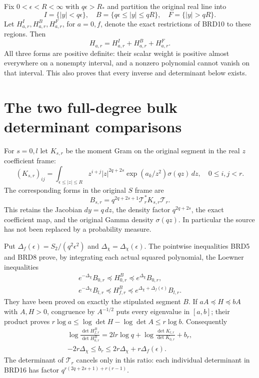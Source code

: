 \documentclass[11pt,a4paper]{article}
\begin{document}
Fix $0<\epsilon<R<\infty$ with $q\epsilon>R_*$ and partition
the original real line into
\[
 I=\{|y|<q\epsilon\},\quad
 B=\{q\epsilon\leq|y|\leq qR\},\quad
 F=\{|y|>qR\}.
\tag{BRD13}
\]
Let $H_{a,r}^I,H_{a,r}^B,H_{a,r}^F$, for $a=0,f$, denote
the exact restrictions of BRD10 to these regions. Then
\[
 H_{a,r}=H_{a,r}^I+H_{a,r}^B+H_{a,r}^F.\tag{BRD14}
\]
All three forms are positive definite: their scalar weight is
positive almost everywhere on a nonempty interval, and a nonzero
polynomial cannot vanish on that interval. This also proves that
every inverse and determinant below exists.

\section{The two full-degree bulk determinant comparisons}

For $s=0,l$ let $K_{s,r}$ be the moment Gram on the original
segment in the real $z$ coefficient frame:
\[
 (K_{s,r})_{ij}=\int_{\epsilon\leq|z|\leq R}
 z^{i+j}|z|^{2q+2s}\exp(a_k/z^2)\sigma(qz)\,dz,
 \quad 0\leq i,j<r.
\tag{BRD15}
\]
The corresponding forms in the original $S$ frame are
\[
 B_{s,r}=q^{2q+2s+1}\mathcal T_r^*K_{s,r}\mathcal T_r.
\tag{BRD16}
\]
This retains the Jacobian $dy=q\,dz$, the density factor
$q^{2q+2s}$, the exact coefficient map, and the original Gamma
density $\sigma(qz)$. In particular the source has not been
replaced by a probability measure.

Put $\Delta_f(\epsilon)=S_2/(q^2\epsilon^2)$ and
$\Delta_\chi=\Delta_\chi(\epsilon)$. The pointwise inequalities
BRD5 and BRD8 prove, by integrating each actual squared
polynomial, the Loewner inequalities
\[
\begin{gathered}
 e^{-\Delta_\chi}B_{0,r}\preceq H_{0,r}^B
                    \preceq e^{\Delta_\chi}B_{0,r},\\
 e^{-\Delta_\chi}B_{l,r}\preceq H_{f,r}^B
                    \preceq e^{\Delta_\chi+\Delta_f(\epsilon)}B_{l,r}.
\end{gathered}\tag{BRD17}
\]
They have been proved on exactly the stipulated segment $B$.
If $aA\preceq H\preceq bA$ with $A,H>0$, congruence by
$A^{-1/2}$ puts every eigenvalue in $[a,b]$; their product
proves $r\log a\leq\log\det H-\log\det A\leq r\log b$.
Consequently
\[
\begin{gathered}
 \log\frac{\det H_{f,r}^B}{\det H_{0,r}^B}
   =2lr\log q+\log\frac{\det K_{l,r}}{\det K_{0,r}}
                       +b_r,\\
 -2r\Delta_\chi\leq b_r
          \leq2r\Delta_\chi+r\Delta_f(\epsilon).
\end{gathered}\tag{BRD18}
\]
The determinant of $\mathcal T_r$ cancels only in this ratio:
each individual determinant in BRD16 has factor
$q^{r(2q+2s+1)+r(r-1)}$.
\end{document}

